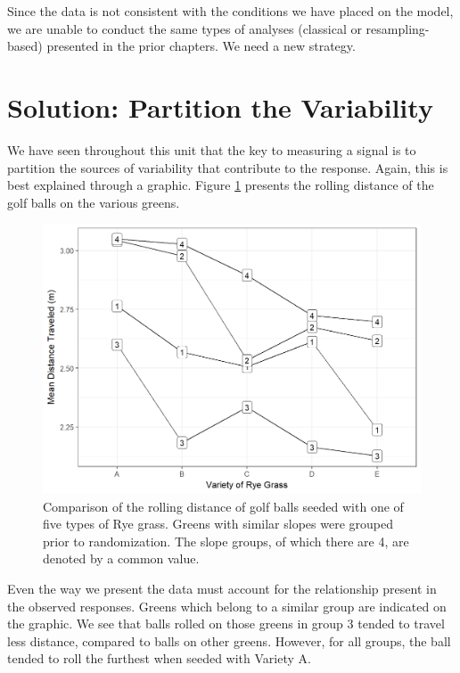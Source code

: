 \documentclass[]{book}
\theoremstyle{definition}
\theoremstyle{definition}
\theoremstyle{definition}
\theoremstyle{remark}
\begin{document}
Since the data is not consistent with the conditions we have placed on
the model, we are unable to conduct the same types of analyses
(classical or resampling-based) presented in the prior chapters. We need
a new strategy.

\section{Solution: Partition the
Variability}\label{solution-partition-the-variability}

We have seen throughout this unit that the key to measuring a signal is
to partition the sources of variability that contribute to the response.
Again, this is best explained through a graphic. Figure
\ref{fig:anovablocking-golf-raw} presents the rolling distance of the
golf balls on the various greens.

\begin{figure}

{\centering \includegraphics[width=0.8\linewidth]{./Images/anovablocking-golf-raw-1} 

}

\caption{Comparison of the rolling distance of golf balls seeded with one of five types of Rye grass.  Greens with similar slopes were grouped prior to randomization.  The slope groups, of which there are 4, are denoted by a common value.}\label{fig:anovablocking-golf-raw}
\end{figure}

Even the way we present the data must account for the relationship
present in the observed responses. Greens which belong to a similar
group are indicated on the graphic. We see that balls rolled on those
greens in group 3 tended to travel less distance, compared to balls on
other greens. However, for all groups, the ball tended to roll the
furthest when seeded with Variety A.
\end{document}
